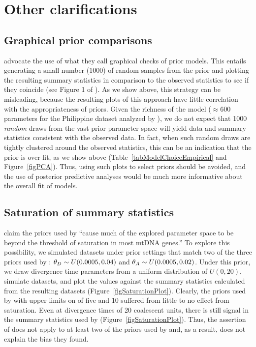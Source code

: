 \section*{Other clarifications}

\subsection*{Graphical prior comparisons}
\citet{Hickerson2013} advocate the use of what they call graphical checks of
prior models.
This entails generating a small number (1000) of random samples from the prior
and plotting the resulting summary statistics in comparison to the observed
statistics to see if they coincide (see Figure 1 of \citet{Hickerson2013}).
As we show above, this strategy can be misleading, because the resulting plots
of this approach have little correlation with the appropriateness of priors.
Given the richness of the \msb model ($\approx 600$ parameters for the Philippine
dataset analyzed by \citet{Hickerson2013}), we do not expect that 1000
\emph{random} draws from the vast prior parameter space will yield data and
summary statistics consistent with the observed data.
In fact, when such random draws are tightly clustered around the observed
statistics, this can be an indication that the prior is over-fit, as we show
above (Table~\ref{tabModelChoiceEmpirical} and Figure~\ref{figPCA}).
Thus, using such plots to select priors should be avoided, and the use of
posterior predictive analyses would be much more informative about the overall
fit of models.

\subsection*{Saturation of summary statistics}
\citet{Hickerson2013} claim the priors used by \citet{Oaks2012} ``cause much of
the explored parameter space to be beyond the threshold of saturation in most
mtDNA genes.'' To explore this possibility, we simulated datasets under prior
settings that match two of the three priors used by \citet{Oaks2012}:
$\meanDescendantTheta{} \sim U(0.0005, 0.04)$ and $\ancestralTheta{} \sim
U(0.0005, 0.02)$.
Under this prior, we draw divergence time parameters from a uniform
distribution of $U(0, 20)$, simulate datasets, and plot the \divt{} values
against the summary statistics calculated from the resulting datasets
(Figure~\ref{figSaturationPlot}).
Clearly, the priors used by \citet{Oaks2012} with upper limits on \divt{} of five
and 10 suffered from little to no effect from saturation.
Even at divergence times of 20 coalescent units, there is still signal in the
summary statistics used by \msb (Figure~\ref{figSaturationPlot}).
Thus, the assertion of \citet{Hickerson2013} does not apply to at least
two of the priors used by \citet{Oaks2012} and, as a result, does not
explain the bias they found.



